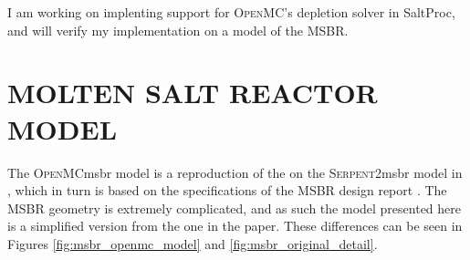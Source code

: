 \documentclass[letterpaper]{mc2023}
\newcommand{\Cyclus}{\textsc{Cyclus}\xspace}
\newcommand{\OpenMC}{\textsc{OpenMC}\xspace}
\newcommand{\SerpentTWO}{\textsc{Serpent2}\xspace}
\newcommand{\ONIX}{\textsc{ONIX}\xspace}
\newcommand{\NJOYTWOONE}{\textsc{NJOY21}\xspace}
\begin{document}


I am working on implenting support for \OpenMC's depletion solver in SaltProc,
and will verify my implementation on a model of the MSBR.

\section{MOLTEN SALT REACTOR MODEL}
\label{sec:msr-model}

The \OpenMC \Gls{msbr} model is a reproduction of the on the \SerpentTWO \Gls{msbr} model in \cite{rykhlevskii_modeling_2019}, which in turn is based on
the specifications of the MSBR design report \cite{robertson_conceptual_1971}.
The MSBR geometry is extremely complicated, and as such the model presented here
is a simplified version from the one in the paper. These differences can be seen in Figures \ref{fig:msbr_openmc_model} and \ref{fig:msbr_original_detail}.
\end{document}
